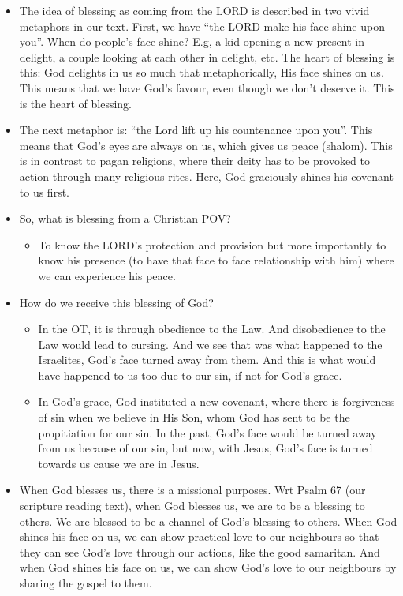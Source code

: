 \begin{itemize}
  \item{The idea of blessing as coming from the LORD is described in two vivid metaphors in our text. First, we have “the LORD make his face shine upon you”. When do people’s face shine? E.g, a kid opening a new present in delight, a couple looking at each other in delight, etc. The heart of blessing is this: God delights in us so much that metaphorically, His face shines on us. This means that we have God’s favour, even though we don’t deserve it. This is the heart of blessing.}
  \item{The next metaphor is: “the Lord lift up his countenance upon you”. This means that God’s eyes are always on us, which gives us peace (shalom). This is in contrast to pagan religions, where their deity has to be provoked to action through many religious rites. Here, God graciously shines his covenant to us first.}
  \item{So, what is blessing from a Christian POV?
  \begin{itemize}
    \item{To know the LORD's protection and provision but more importantly to know his presence (to have that face to face relationship with him) where we can experience his peace.}
  \end{itemize}}
  \item{How do we receive this blessing of God?
  \begin{itemize}
    \item{ In the OT, it is through obedience to the Law. And disobedience to
    the Law would lead to cursing. And we see that was what happened to the
    Israelites, God’s face turned away from them. And this is what would have
    happened to us too due to our sin, if not for God’s grace.}
    \item{In God’s grace, God instituted a new covenant, where there is forgiveness of sin when we believe in His Son, whom God has sent to be the propitiation for our sin. In the past, God’s face would be turned away from us because of our sin, but now, with Jesus, God’s face is turned towards us cause we are in Jesus.}
  \end{itemize}}
  \item{When God blesses us, there is a missional purposes. Wrt Psalm 67 (our scripture reading text), when God blesses us, we are to be a blessing to others. We are blessed to be a channel of God’s blessing to others. When God shines his face on us, we can show practical love to our neighbours so that they can see God’s love through our actions, like the good samaritan. And when God shines his face on us, we can show God’s love to our neighbours by sharing the gospel to them.}

\end{itemize}
